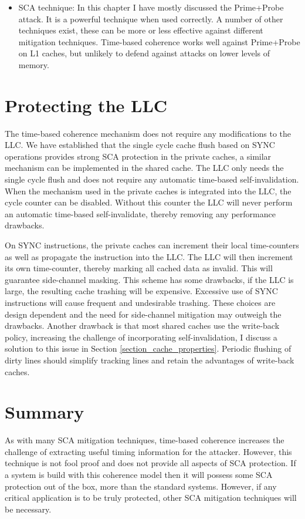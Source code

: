 \begin{itemize}
		\item SCA technique: In this chapter I have mostly discussed the Prime+Probe attack. It is a powerful technique when used correctly. A number of other techniques exist, these can be more or less effective against different mitigation techniques. Time-based coherence works well against Prime+Probe on L1 caches, but unlikely to defend against attacks on lower levels of memory.
	\end{itemize}
	
\section{Protecting the LLC}
\label{protecting_llc}
	The time-based coherence mechanism does not require any modifications to the LLC. We have established that the single cycle cache flush based on SYNC operations provides strong SCA protection in the private caches, a similar mechanism can be implemented in the shared cache. The LLC only needs the single cycle flush and does not require any automatic time-based self-invalidation. When the mechanism used in the private caches is integrated into the LLC, the cycle counter can be disabled. Without this counter the LLC will never perform an automatic time-based self-invalidate, thereby removing any performance drawbacks. 
		
	On SYNC instructions, the private caches can increment their local time-counters as well as propagate the instruction into the LLC. The LLC will then increment its own time-counter, thereby marking all cached data as invalid. This will guarantee side-channel masking. This scheme has some drawbacks, if the LLC is large, the resulting cache trashing will be expensive. Excessive use of SYNC instructions will cause frequent and undesirable trashing. These choices are design dependent and the need for side-channel mitigation may outweigh the drawbacks. Another drawback is that most shared caches use the write-back policy, increasing the challenge of incorporating self-invalidation, I discuss a solution to this issue in Section \ref{section_cache_properties}. Periodic flushing of dirty lines should simplify tracking lines and retain the advantages of write-back caches.

\section{Summary}
	As with many SCA mitigation techniques, time-based coherence increases the challenge of extracting useful timing information for the attacker. However, this technique is not fool proof and does not provide all aspects of SCA protection. If a system is build with this coherence model then it will possess some SCA protection out of the box, more than the standard systems. However, if any critical application is to be truly protected, other SCA mitigation techniques will be necessary. 
	
